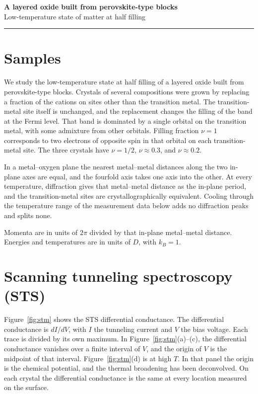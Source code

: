 \documentclass[12pt]{article}
\begin{document}
\begin{center}
{\Large\bfseries A layered oxide built from perovskite-type blocks}\\[0.28em]
{\normalsize Low-temperature state of matter at half filling}
\end{center}
\vspace{-0.15em}
\noindent\rule{\textwidth}{0.45pt}

\section{Samples}

We study the low-temperature state at half filling of a layered oxide built from perovskite-type blocks. Crystals of several compositions were grown by replacing a fraction of the cations on sites other than the transition metal. The transition-metal site itself is unchanged, and the replacement changes the filling of the band at the Fermi level. That band is dominated by a single orbital on the transition metal, with some admixture from other orbitals. Filling fraction \(\nu=1\) corresponds to two electrons of opposite spin in that orbital on each transition-metal site. The three crystals have \(\nu=1/2\), \(\nu\approx 0.3\), and \(\nu\approx 0.2\).

In a metal–oxygen plane the nearest metal–metal distances along the two in-plane axes are equal, and the fourfold axis takes one axis into the other. At every temperature, diffraction gives that metal–metal distance as the in-plane period, and the transition-metal sites are crystallographically equivalent. Cooling through the temperature range of the measurement data below adds no diffraction peaks and splits none.

Momenta are in units of \(2\pi\) divided by that in-plane metal–metal distance. Energies and temperatures are in units of \(D\), with \(k_B=1\).

\section{Scanning tunneling spectroscopy (STS)}

Figure~\ref{fig:stm} shows the STS differential conductance. The differential conductance is \(dI/dV\), with \(I\) the tunneling current and \(V\) the bias voltage. Each trace is divided by its own maximum. In Figure~\ref{fig:stm}(a)--(c), the differential conductance vanishes over a finite interval of \(V\), and the origin of \(V\) is the midpoint of that interval. Figure~\ref{fig:stm}(d) is at high \(T\). In that panel the origin is the chemical potential, and the thermal broadening has been deconvolved. On each crystal the differential conductance is the same at every location measured on the surface.
\end{document}
